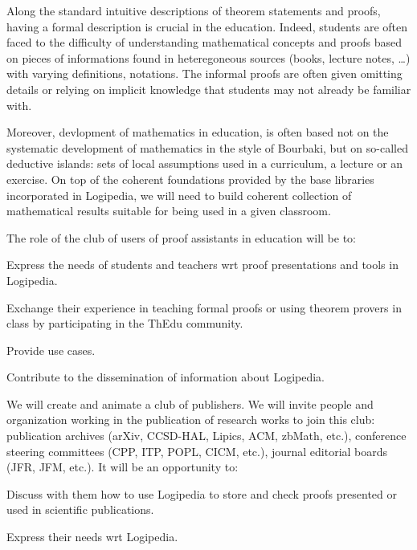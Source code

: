 \begin{workpackage}[id=dissemination,wphases=0-48,type=MGT,
  short=Dissemination,%
  title={Dissemination, communication and exploitation},
  lead=Inr]
\begin{tasklist}
\begin{task}[id=teachers-club,
      title=Expanding the use of Logipedia in education,
      lead=Str,StrRM=2]
    Along the standard intuitive descriptions of theorem statements
    and proofs, having a formal description is crucial in the
    education. Indeed, students are often faced to the difficulty of
    understanding mathematical concepts and proofs based on pieces of
    informations found in heteregoneous sources (books, lecture notes,
    \ldots) with varying definitions, notations. The informal proofs
    are often given omitting details or relying on implicit knowledge
    that students may not already be familiar with.

    Moreover, devlopment of mathematics in education, is often based
    not on the systematic development of mathematics in the style of
    Bourbaki, but on so-called deductive islands: sets of local
    assumptions used in a curriculum, a lecture or an exercise.  On
    top of the coherent foundations provided by the base libraries
    incorporated in Logipedia, we will need to build coherent
    collection of mathematical results suitable for being used in a
    given classroom.

    The role of the club of users of proof assistants in education will be to:
    \begin{compactitem}
    \item Express the needs of students and teachers wrt proof
      presentations and tools in Logipedia.
    \item Exchange their experience in teaching formal proofs or using
      theorem provers in class by participating in the ThEdu community.
    \item Provide use cases.
    \item Contribute to the dissemination of information about Logipedia.
    \end{compactitem}

  \end{task}

  \begin{task}[id=publishers-club,
      title=Expanding the use of Logipedia in publishing,
      lead=Zib,ZibRM=12]
    We will create and animate a club of publishers. We will invite
    people and organization working in the publication of research
    works to join this club: publication archives (arXiv, CCSD-HAL,
    Lipics, ACM, zbMath, etc.), conference steering committees (CPP,
    ITP, POPL, CICM, etc.), journal editorial boards (JFR, JFM,
    etc.). It will be an opportunity to:
    \begin{compactitem}
    \item Discuss with them how to use Logipedia to store and check
      proofs presented or used in scientific publications.
    \item Express their needs wrt Logipedia.
    \end{compactitem}
  \end{task}


\end{tasklist}
\end{workpackage}

